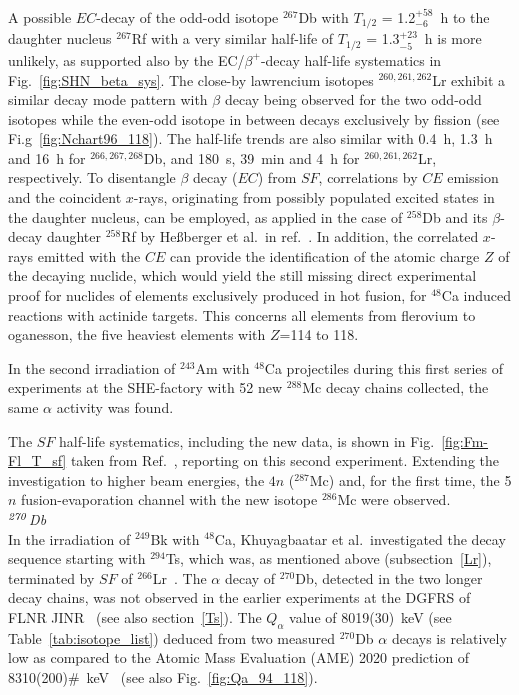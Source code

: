A possible $EC$-decay of the odd-odd isotope $^{267}$Db with $T_{1/2}$ = 1.2$^{+58}_{-6}$~h to the daughter nucleus  $^{267}$Rf with a very similar half-life of $T_{1/2}$ = 1.3$^{+23}_{-5}$~h is more unlikely, as supported also by the EC/$\beta^+$-decay half-life systematics in Fig.~\ref{fig:SHN_beta_sys}.
The close-by lawrencium isotopes $^{260,261,262}$Lr exhibit a similar decay mode pattern with $\beta$ decay being observed for the two odd-odd isotopes while the even-odd isotope in between decays exclusively by fission (see Fi.g~\ref{fig:Nchart96_118}).
The half-life trends are also similar with 0.4~h, 1.3~h and 16~h for $^{266,267,268}$Db, and 180~s, 39~min and 4~h for $^{260,261,262}$Lr, respectively.
To disentangle $\beta$ decay ($EC$) from $SF$, correlations by $CE$ emission and the coincident $x$-rays, originating from possibly populated excited states in the daughter nucleus, can be employed, as applied in the case of $^{258}$Db and its $\beta$-decay daughter $^{258}$Rf by He{\ss}berger et al.~in ref.~\cite{Hessberger2016a}.
In addition, the correlated $x$-rays emitted with the $CE$ can provide the identification of the atomic charge $Z$ of the decaying nuclide, which would yield the still missing direct experimental proof for nuclides of elements exclusively produced in hot fusion, for $^{48}$Ca induced reactions with actinide targets.
This concerns all elements from flerovium to oganesson, the five heaviest elements with $Z$=114 to 118.

In the second irradiation of $^{243}$Am with $^{48}$Ca projectiles during this first series of experiments at the SHE-factory with 52 new $^{288}$Mc decay chains collected, the same $\alpha$ activity was found.

The $SF$ half-life systematics, including the new data, is shown in Fig.~\ref{fig:Fm-Fl_T_sf} taken from Ref.~\cite{Oganessian2022d}, reporting on this second experiment. 
Extending the investigation to higher beam energies, the $4n$ ($^{287}$Mc) and, for the first time, the 5$n$ fusion-evaporation channel with the new isotope $^{286}$Mc were observed.\\

{\it $^{\it270}$Db}\\
In the irradiation of $^{249}$Bk with $^{48}$Ca, Khuyagbaatar et al.~investigated the decay sequence starting with $^{294}$Ts, which was, as mentioned above (subsection~\ref{Lr}), terminated by $SF$ of $^{266}$Lr~\cite{Khuyagbaatar2019}. The $\alpha$ decay of $^{270}$Db, detected in the two longer decay chains, was not observed in the earlier experiments at the DGFRS of FLNR JINR~\cite{Oganessian2013b} (see also section~\ref{Ts}).
The $Q_\alpha$ value of 8019(30)~keV (see Table~\ref{tab:isotope_list}) deduced from two measured $^{270}$Db $\alpha$ decays is relatively low as compared to the Atomic Mass Evaluation (AME) 2020 prediction of 8310(200)\#~keV~\cite{Wang2021} (see also Fig.~\ref{fig:Qa_94_118}).


